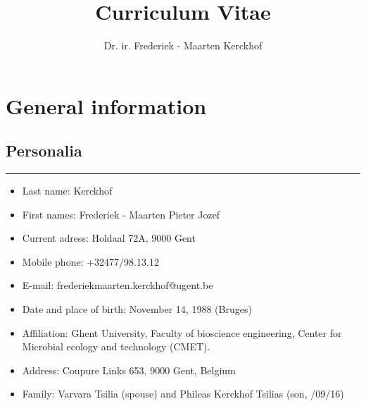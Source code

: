 \documentclass[a4paper,11pt,oneside]{article}
\title{Curriculum Vitae}
\author{Dr. ir. Frederiek - Maarten Kerckhof}
\begin{document}
\maketitle

\section*{General information}
\subsection*{Personalia}
\rule{\textwidth}{1pt}
\begin{itemize}
  \item Last name: Kerckhof
  \item First names: Frederiek - Maarten Pieter Jozef
  \item Current adress: Holdaal 72A, 9000 Gent
  \item Mobile phone: +32477/98.13.12
  \item E-mail: frederiekmaarten.kerckhof@ugent.be
  \item Date and place of birth: November 14, 1988 (Bruges)
  \item Affiliation: Ghent University, Faculty of bioscience engineering, Center for Microbial ecology and technology (CMET).
  \item Address: Coupure Links 653, 9000 Gent, Belgium
  \item Family: Varvara Tsilia (spouse) and Phileas Kerckhof Tsilias (son, /09/16)
\end{itemize}
\end{document}
